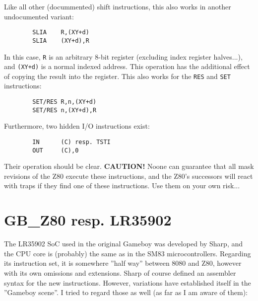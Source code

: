 \documentclass[12pt,twoside]{report}
\newcommand{\bb}[1]{{\bf #1}}
\newcommand{\tty}[1]{{\tt #1}}
\begin{document}
Like all other (docummented) shift instructions, this also works in
another undocumented variant:
\begin{verbatim}
        SLIA    R,(XY+d)
        SLIA    (XY+d),R
\end{verbatim}
In this case, \tty{R} is an arbitrary 8-bit register (excluding index
register halves...), and \tty{(XY+d)} is a normal indexed address.  This
operation has the additional effect of copying the result into the
register.  This also works for the \tty{RES} and \tty{SET} instructions:
\begin{verbatim}
        SET/RES R,n,(XY+d)
        SET/RES n,(XY+d),R
\end{verbatim}
Furthermore, two hidden I/O instructions exist:
\begin{verbatim}
        IN      (C) resp. TSTI
        OUT     (C),0
\end{verbatim}
Their operation should be clear.  \bb{CAUTION!}  Noone can
guarantee that all mask revisions of the Z80 execute these
instructions, and the Z80's successors will react with traps if they
find one of these instructions.  Use them on your own risk...


\section{GB\_Z80 resp. LR35902}

The LR35902 SoC used in the original Gameboy  was developed by Sharp,
and the CPU core is (probably) the same as in the SM83
microcontrollers.  Regarding its instruction set, it is somewhere
''half way'' between 8080 and Z80, however with its own omissions and
extensions.  Sharp of course defined an assembler syntax for the new
instructions.  However, variations have established itself in the
''Gameboy scene''.  I tried to regard those as well (as far as I am
aware of them):
\end{document}

